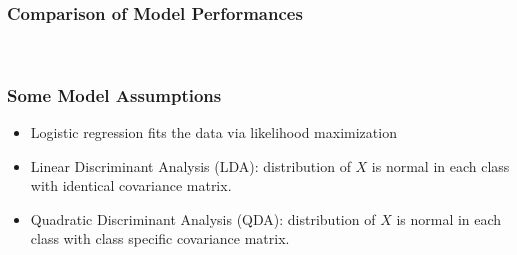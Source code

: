 \documentclass[serif, xcolor={dvipsnames}]{beamer} %
\begin{document}
\begin{frame}
\frametitle{Comparison of Model Performances}
\vspace{-.1in}
\begin{figure}[!ht] %
\captionsetup[subfigure]{labelformat=empty}
\centering
\hspace{-.12in}
\\
\vspace{-.35in}
\end{figure}
\end{frame}

\begin{frame}[t]
\frametitle{Some Model Assumptions}

\begin{itemize}
\item Logistic regression fits the data via likelihood maximization
\item Linear Discriminant Analysis (LDA): distribution of $X$ is normal in each class with identical covariance matrix.
\item Quadratic Discriminant Analysis (QDA): distribution of $X$ is normal in each class with class specific covariance matrix.
\end{itemize}
\end{frame}
\end{document}

